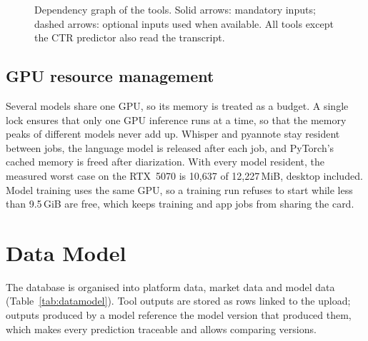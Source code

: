 \begin{figure}[H]
\centering
{}
\caption{Dependency graph of the tools. Solid arrows: mandatory inputs; dashed arrows: optional inputs used when available. All tools except the CTR predictor also read the transcript.}
\label{fig:toolgraph}
\end{figure}

\subsection*{GPU resource management}

Several models share one GPU, so its memory is treated as a budget. A single lock ensures that only one GPU inference runs at a time, so that the memory peaks of different models never add up. Whisper and pyannote stay resident between jobs, the language model is released after each job, and PyTorch's cached memory is freed after diarization. With every model resident, the measured worst case on the RTX~5070 is 10{,}637 of 12{,}227\,MiB, desktop included. Model training uses the same GPU, so a training run refuses to start while less than 9.5\,GiB are free, which keeps training and app jobs from sharing the card.

\section{Data Model}

The database is organised into platform data, market data and model data (Table~\ref{tab:datamodel}). Tool outputs are stored as rows linked to the upload; outputs produced by a model reference the model version that produced them, which makes every prediction traceable and allows comparing versions.

